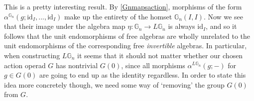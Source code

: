 This is a pretty interesting result. By \cref{Gnmapsaction}, morphisms of the form $\alpha^{\mathbb{G}_n}(g; \mathrm{id}_I, ..., \mathrm{id}_I)$ make up the entirety of the homset $\mathbb{G}_n(I,I)$. Now we see that their image under the algebra map $\eta: \mathbb{G}_n \to L\mathbb{G}_n$ is always $\mathrm{id}_I$, and so it follows that the unit endomorphisms of free algebras are wholly unrelated to the unit endomorphisms of the corresponding free \emph{invertible} algebras. In particular, when constructing $L\mathbb{G}_n$ it seems that it should not matter whether our chosen action operad $G$ has nontrivial $G(0)$, since all morphisms $\alpha^{L\mathbb{G}_n}(g; - )$ for $g \in G(0)$ are going to end up as the identity regardless. In order to state this idea more concretely though, we need some way of `removing' the group $G(0)$ from $G$.

